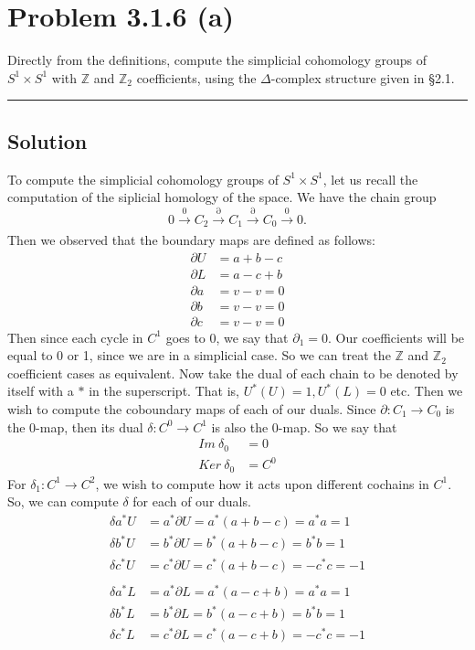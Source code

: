 \documentclass{article}
\theoremstyle{definition}
\begin{document}
\section*{Problem 3.1.6 (a)}
Directly from the definitions, compute the simplicial cohomology groups 
of $S^1 \times S^1$ with $\mathbb{Z}$ and $\mathbb{Z}_2$ coefficients,
using the $\Delta$-complex structure given in \S 2.1.
\\
\par\noindent\rule{\textwidth}{0.4pt}
\subsection*{Solution}
To compute the simplicial cohomology groups of $S^1 \times S^1$, let us recall 
the computation of the siplicial homology of the space. We have the chain group 
\[
    0 \xrightarrow{0} C_2 \xrightarrow{\partial} C_1 \xrightarrow{\partial} C_0 \xrightarrow[]{0} 0    
.\]
Then we observed that the boundary maps are defined as follows:
\begin{align*}
    \partial U &= a + b - c \\
    \partial L &= a - c + b \\
    \partial a &= v - v = 0 \\
    \partial b &= v - v = 0 \\
    \partial c &= v - v = 0
\end{align*}
Then since each cycle in $C^1$ goes to 0, we say that $\partial_1 = 0$.
Our coefficients will be equal to 0 or 1, since we are in a simplicial case.
So we can treat the $\mathbb{Z}$ and $\mathbb{Z}_2$ coefficient cases as equivalent.
Now take the dual of each chain to be denoted by itself with a 
$*$ in the superscript. That is, $U^*(U) = 1, U^*(L) = 0$ etc. Then we wish
to compute the coboundary maps of each of our duals.
Since $\partial: C_1 \to C_0$ is the 0-map, then its dual 
$\delta: C^0 \to C^1$ is also the 0-map. 
So we say that
\begin{align*}
    Im \ \delta_0 &= 0 \\
    Ker \ \delta_0 &= C^0 
\end{align*}
For $\delta_1:C^1\to C^2$,
we wish to compute how it acts upon different cochains in $C^1$.
So, we can compute $\delta$ for each of our duals.
\begin{align*}
    \delta a^* U &= a^* \partial U = a^* (a + b - c) = a^* a =1 \\
    \delta b^* U &= b^* \partial U = b^* (a + b - c) = b^* b = 1 \\
    \delta c^* U &= c^* \partial U = c^* (a + b - c) = -c^* c = -1 \\\\
    \delta a^* L &= a^* \partial L = a^* (a - c + b) = a^* a = 1 \\
    \delta b^* L &= b^* \partial L = b^* (a - c + b) = b^* b = 1 \\
    \delta c^* L &= c^* \partial L = c^* (a - c + b) = - c^* c = -1
\end{align*}
\end{document}
